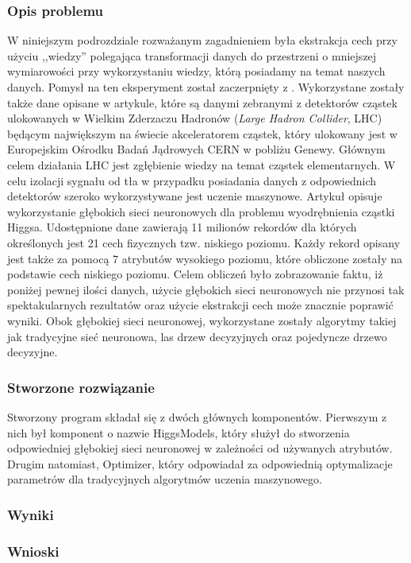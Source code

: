 \subsubsection{Opis problemu}
W niniejszym podrozdziale rozważanym zagadnieniem była ekstrakcja cech przy użyciu ,,wiedzy'' polegająca transformacji danych do przestrzeni o mniejszej wymiarowości przy wykorzystaniu wiedzy, którą posiadamy na temat naszych danych. Pomysł na ten eksperyment został zaczerpnięty z \cite{higgs1}. Wykorzystane zostały także dane opisane w artykule, które są danymi zebranymi z detektorów cząstek ulokowanych w Wielkim Zderzaczu Hadronów (\textit{Large Hadron Collider}, LHC) będącym największym na świecie akceleratorem cząstek, który ulokowany jest w Europejskim Ośrodku Badań Jądrowych CERN w pobliżu Genewy. Głównym celem działania LHC jest zgłębienie wiedzy na temat cząstek elementarnych. W celu izolacji sygnału od tła w przypadku posiadania danych z odpowiednich detektorów szeroko wykorzystywane jest uczenie maszynowe. Artykuł opisuje wykorzystanie głębokich sieci neuronowych dla problemu wyodrębnienia cząstki Higgsa. Udostępnione dane zawierają 11 milionów rekordów dla których określonych jest 21 cech fizycznych tzw. niskiego poziomu. Każdy rekord opisany jest także za pomocą 7 atrybutów wysokiego poziomu, które obliczone zostały na podstawie cech niskiego poziomu. Celem obliczeń było zobrazowanie faktu, iż poniżej pewnej ilości danych, użycie głębokich sieci neuronowych nie przynosi tak spektakularnych rezultatów oraz użycie ekstrakcji cech może znacznie poprawić wyniki. Obok głębokiej sieci neuronowej, wykorzystane zostały algorytmy takiej jak tradycyjne sieć neuronowa, las drzew decyzyjnych oraz pojedyncze drzewo decyzyjne.

\subsubsection{Stworzone rozwiązanie}
Stworzony program składał się z dwóch głównych komponentów. Pierwszym z nich był komponent o nazwie HiggsModels, który służył do stworzenia odpowiedniej głębokiej sieci neuronowej w zależności od używanych atrybutów. Drugim natomiast, Optimizer, który odpowiadał za odpowiednią optymalizacje parametrów dla tradycyjnych algorytmów uczenia maszynowego.

\subsubsection{Wyniki}
\subsubsection{Wnioski}


